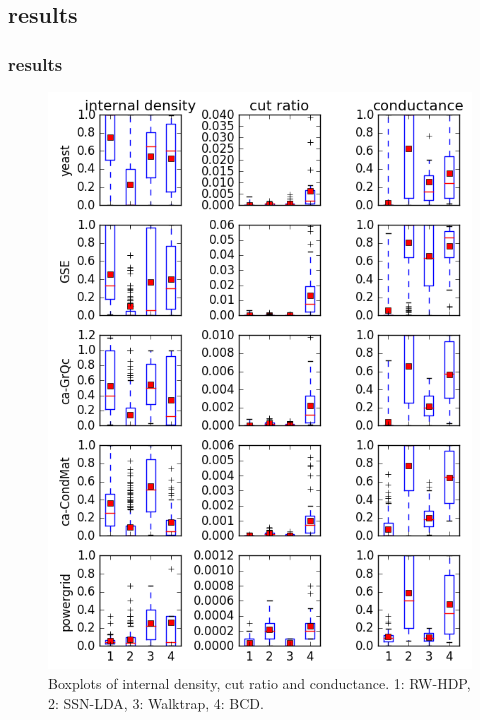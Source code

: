 \documentclass{beamer}
\begin{document}
\subsection{results}
\begin{frame}
\frametitle{results}
\begin{figure}[h!]
	\centering
	\vspace{.3in}
	\includegraphics[scale=0.3]{metrics}
	\vspace{.3in}
	\caption{Boxplots of internal density, cut ratio and conductance. 1: RW-HDP, 2: SSN-LDA, 3: Walktrap, 4: BCD.}
\end{figure}
\end{frame}
\end{document}
